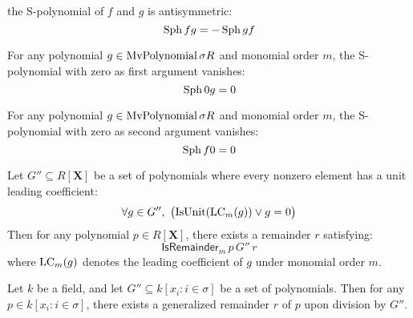        \begin{lemma}\label{sPolynomial_antisymm}
          \leanok
          the S-polynomial of $f$ and $g$ is antisymmetric:
\[
  \operatorname{Sph}{f}{g} = -\operatorname{Sph}{g}{f}
\]

        \end{lemma}

        \begin{lemma}\label{sPolynomial_eq_zero_of_left_eq_zero}
          \leanok
          For any polynomial $g \in \operatorname{MvPolynomial}{\sigma}{R}$ and monomial order $m$,
the S-polynomial with zero as first argument vanishes:
\[
  \operatorname{Sph}{0}{g} = 0
\]

        \end{lemma}

        \begin{lemma}\label{sPolynomial_eq_zero_of_right_eq_zero'}
          \leanok
          For any polynomial $g \in \operatorname{MvPolynomial}{\sigma}{R}$ and monomial order $m$,
the S-polynomial with zero as second argument vanishes:
\[
  \operatorname{Sph}{f}{0} = 0
\]

        \end{lemma}

        \begin{lemma}\label{div_set'}
          \leanok
          Let $G'' \subseteq R[\mathbf{X}]$ be a set of polynomials where every nonzero element has a unit leading coefficient:
\[
  \forall g \in G'',\ \big(\mathrm{IsUnit}(\LC_m(g)) \lor g = 0\big)
\]
Then for any polynomial $p \in R[\mathbf{X}]$, there exists a remainder $r$ satisfying:
\[
  \mathsf{IsRemainder}_m\,p\,G''\,r
\]
where $\operatorname{LC}_m(g)$ denotes the leading coefficient of $g$ under monomial order $m$.

        \end{lemma}

        \begin{lemma}\label{div_set''}
          \leanok
          Let \( k \) be a field, and let \( G'' \subseteq k[x_i : i \in \sigma] \) be a set of polynomials.
Then for any \( p \in k[x_i : i \in \sigma] \), there exists a generalized remainder \( r \) of \( p \) upon division by \( G'' \).

        \end{lemma}

